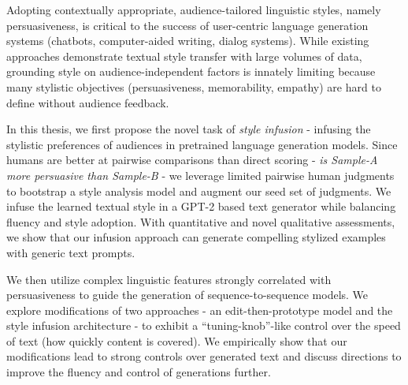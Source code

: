 Adopting contextually appropriate, audience-tailored linguistic styles, namely persuasiveness, is critical to the success of user-centric language generation systems (\eg chatbots, computer-aided writing, dialog systems). While existing approaches demonstrate textual style transfer with large volumes of data, grounding style on audience-independent factors is innately limiting because many stylistic objectives (\eg persuasiveness, memorability, empathy) are hard to define without audience feedback.

In this thesis, we first propose the novel task of \textit{style infusion} - infusing the stylistic preferences of audiences in pretrained language generation models. Since humans are better at pairwise comparisons than direct scoring - \ie \textit{is Sample-A more persuasive than Sample-B} - we leverage limited pairwise human judgments to bootstrap a style analysis model and augment our seed set of judgments. We infuse the learned textual style in a GPT-2 based text generator while balancing fluency and style adoption. With quantitative and novel qualitative assessments, we show that our infusion approach can generate compelling stylized examples with generic text prompts. 

We then utilize complex linguistic features strongly correlated with persuasiveness to guide the generation of sequence-to-sequence models. We explore modifications of two approaches - an edit-then-prototype model and the style infusion architecture - to exhibit a ``tuning-knob''-like control over the speed of text (\ie how quickly content is covered). We empirically show that our modifications lead to strong controls over generated text and discuss directions to improve the fluency and control of generations further.


